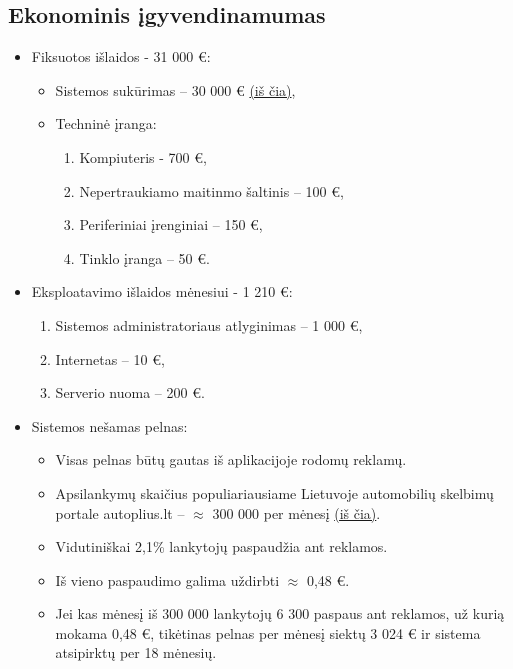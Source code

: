 \documentclass[12pt]{article}
\begin{document}
	\pagebreak
	
	\subsection{Ekonominis įgyvendinamumas}
	
	\begin{itemize}
	\item{Fiksuotos išlaidos - 31 000 €:}
	\begin{itemize}
	\item{Sistemos sukūrimas – 30 000 € \href{http://howmuchtomakeanapp.com}{(iš čia)},}
	
	\item{Techninė įranga:}
	\begin{enumerate}
		\item{Kompiuteris - 700 €,}
		\item{Nepertraukiamo maitinmo šaltinis – 100 €,}
		\item{Periferiniai įrenginiai – 150 €,}
		\item{Tinklo įranga – 50 €.}
	\end{enumerate}
	\end{itemize}
	
	\item{Eksploatavimo išlaidos mėnesiui - 1 210 €:}
	\begin{enumerate}
		\item{Sistemos administratoriaus atlyginimas – 1 000 €,}
		\item{Internetas – 10 €,}
		\item{Serverio nuoma – 200 €.}
	\end{enumerate}
	
	\item{Sistemos nešamas pelnas:}
	\begin{itemize}
		\item{Visas pelnas būtų gautas iš aplikacijoje rodomų reklamų.}
		\item{Apsilankymų skaičius populiariausiame Lietuvoje automobilių skelbimų portale autoplius.lt – $\approx$ 300 000 per mėnesį \href{http://www.siteworthtraffic.com/report/autoplius.lt}{(iš čia)}.}
		\item{Vidutiniškai 2,1\% lankytojų paspaudžia ant reklamos.}
		\item{Iš vieno paspaudimo galima uždirbti $\approx$ 0,48 €.}
		\item{Jei kas mėnesį iš 300 000 lankytojų 6 300 paspaus ant reklamos, už kurią mokama 0,48 €, tikėtinas pelnas per mėnesį siektų 3 024 € ir sistema atsipirktų per 18 mėnesių.}
	\end{itemize}
	\end{itemize}
	
\end{document}
